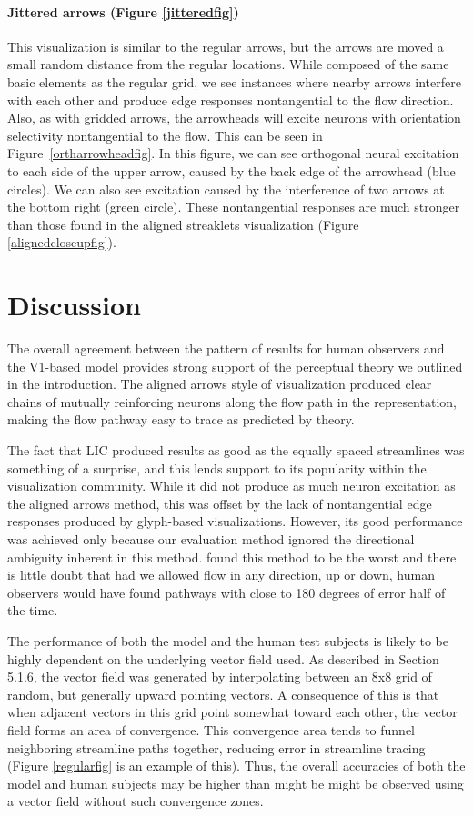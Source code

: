 \documentclass[prodmode,hillsideplop]{../acmlarge}
\begin{document}
\paragraph{Jittered arrows (Figure \ref{jitteredfig})}
This visualization is similar to the regular arrows, but the arrows
are moved a small random distance from the regular locations. While
composed of the same basic elements as the regular grid, we see
instances where nearby arrows interfere with each other and produce
edge responses nontangential to the flow direction. Also, as with
gridded arrows, the arrowheads will excite neurons with orientation
selectivity nontangential to the flow. This can be seen in
Figure~\ref{ortharrowheadfig}. In this figure, we can see orthogonal
neural excitation to each side of the upper arrow, caused by the back
edge of the arrowhead (blue circles). We can also see excitation
caused by the interference of two arrows at the bottom right (green
circle). These nontangential responses are much stronger than those
found in the aligned streaklets visualization (Figure \ref{alignedcloseupfig}).


\section{Discussion}
The overall agreement between the pattern of results for human
observers and the V1-based model provides strong support of the
perceptual theory we outlined in the introduction. The aligned arrows
style of visualization produced clear chains of mutually reinforcing
neurons along the flow path in the representation, making the flow
pathway easy to trace as predicted by theory.

The fact that LIC produced results as good as the equally spaced
streamlines was something of a surprise, and this lends support to
its popularity within the visualization community. While it did not
produce as much neuron excitation as the aligned arrows method, this
was offset by the lack of nontangential edge responses produced by
glyph-based visualizations. However, its good performance was
achieved only because our evaluation method ignored the directional
ambiguity inherent in this method.  found this
method to be the worst and there is little doubt that had we allowed
flow in any direction, up or down, human observers would have found
pathways with close to 180 degrees of error half of the time.

The performance of both the model and the human test subjects is
likely to be highly dependent on the underlying vector field used.
As described in Section 5.1.6, the vector field was generated by
interpolating between an 8x8 grid of random, but generally upward
pointing vectors. A consequence of this is that when adjacent vectors
in this grid point somewhat toward each other, the vector field forms
an area of convergence. This convergence area tends to funnel
neighboring streamline paths together, reducing error in streamline
tracing (Figure \ref{regularfig} is an example of this).  Thus, the
overall accuracies of both the model and human subjects may be higher
than might be might be observed using a vector field without such convergence zones.
\end{document}

